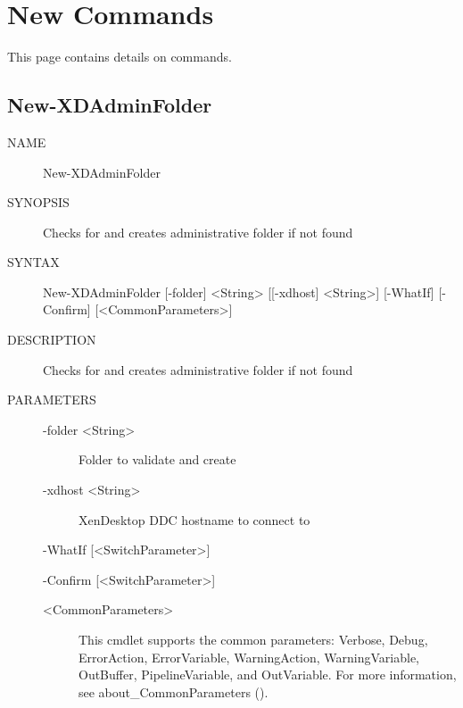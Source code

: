 \documentclass[letterpaper,10pt,english]{sphinxmanual}
\begin{document}
\chapter{New Commands}
\label{\detokenize{cmd_new:new-commands}}\label{\detokenize{cmd_new::doc}}
This page contains details on  commands.


\section{New-XDAdminFolder}
\label{\detokenize{cmd_new:new-xdadminfolder}}\begin{description}
\item[{NAME}] \leavevmode
New-XDAdminFolder

\item[{SYNOPSIS}] \leavevmode
Checks for and creates administrative folder if not found

\item[{SYNTAX}] \leavevmode
New-XDAdminFolder {[}-folder{]} \textless{}String\textgreater{} {[}{[}-xdhost{]} \textless{}String\textgreater{}{]} {[}-WhatIf{]} {[}-Confirm{]} {[}\textless{}CommonParameters\textgreater{}{]}

\item[{DESCRIPTION}] \leavevmode
Checks for and creates administrative folder if not found

\item[{PARAMETERS}] \leavevmode\begin{description}
\item[{-folder \textless{}String\textgreater{}}] \leavevmode
Folder to validate and create

\item[{-xdhost \textless{}String\textgreater{}}] \leavevmode
XenDesktop DDC hostname to connect to

\end{description}

-WhatIf {[}\textless{}SwitchParameter\textgreater{}{]}

-Confirm {[}\textless{}SwitchParameter\textgreater{}{]}
\begin{description}
\item[{\textless{}CommonParameters\textgreater{}}] \leavevmode
This cmdlet supports the common parameters: Verbose, Debug,
ErrorAction, ErrorVariable, WarningAction, WarningVariable,
OutBuffer, PipelineVariable, and OutVariable. For more information, see
about\_CommonParameters ().


\end{description}
\end{description}
\end{document}
